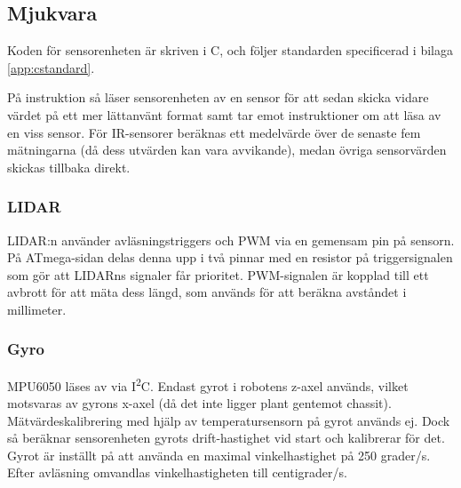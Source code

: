\documentclass[a4paper,11pt]{article}
\begin{document}
\begin{HardwareList}
\end{HardwareList}

\subsection{Mjukvara}

Koden för sensorenheten är skriven i C, och följer standarden specificerad i bilaga \ref{app:cstandard}.

På instruktion så läser sensorenheten av en sensor för att sedan skicka vidare värdet på ett mer lättanvänt format samt tar emot instruktioner om att läsa av en viss sensor. För IR-sensorer beräknas ett medelvärde över de senaste fem mätningarna (då dess utvärden kan vara avvikande), medan övriga sensorvärden skickas tillbaka direkt.

\subsubsection{LIDAR}
LIDAR:n använder avläsningstriggers och PWM via en gemensam pin på sensorn. På ATmega-sidan delas denna upp i två pinnar med en resistor på triggersignalen som gör att LIDARns signaler får prioritet. PWM-signalen är kopplad till ett avbrott för att mäta dess längd, som används för att beräkna avståndet i millimeter.

\subsubsection{Gyro}
MPU6050 läses av via I\textsuperscript{2}C. Endast gyrot i robotens z-axel används, vilket motsvaras av gyrons x-axel (då det inte ligger plant gentemot chassit). Mätvärdeskalibrering med hjälp av temperatursensorn på gyrot används ej. Dock så beräknar sensorenheten gyrots drift-hastighet vid start och kalibrerar för det. Gyrot är inställt på att använda en maximal vinkelhastighet på 250 grader/s. Efter avläsning omvandlas vinkelhastigheten till centigrader/s.
\end{document}
